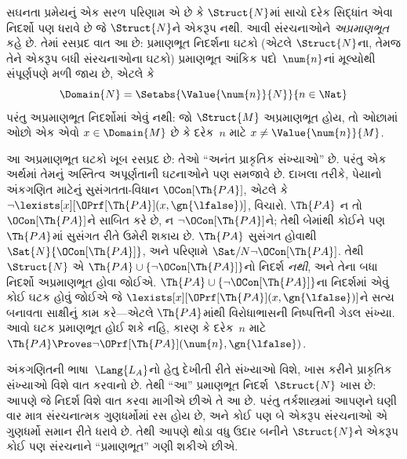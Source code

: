સઘનતા પ્રમેયનું એક સરળ પરિણામ એ છે કે $\Struct{N}$માં સાચો દરેક
સિદ્ધાંત એવા નિદર્શો પણ ધરાવે છે જે $\Struct{N}$ને એકરૂપ નથી. આવી
સંરચનાઓને \emph{અપ્રમાણભૂત} કહે છે. તેમાં રસપ્રદ વાત આ છે: પ્રમાણભૂત
નિદર્શના ઘટકો (એટલે $\Struct{N}$ના, તેમજ તેને એકરૂપ બધી
સંરચનાઓના ઘટકો) પ્રમાણભૂત આંકિક પદો~$\num{n}$નાં મૂલ્યોથી
સંપૂર્ણપણે મળી જાય છે, એટલે કે
\[
\Domain{N} = \Setabs{\Value{\num{n}}{N}}{n \in \Nat}
\]
પરંતુ અપ્રમાણભૂત નિદર્શોમાં એવું નથી: જો $\Struct{M}$ અપ્રમાણભૂત હોય,
તો ઓછામાં ઓછો એક એવો $x\in\Domain{M}$ છે કે દરેક~$n$ માટે
$x\neq\Value{\num{n}}{M}$.

આ અપ્રમાણભૂત ઘટકો ખૂબ રસપ્રદ છે: તેઓ ``અનંત પ્રાકૃતિક સંખ્યાઓ'' છે.
પરંતુ એક અર્થમાં તેમનું અસ્તિત્વ અપૂર્ણતાની ઘટનાઓને પણ સમજાવે છે.
દાખલા તરીકે, પેયાનો અંકગણિત માટેનું સુસંગતતા-વિધાન
$\OCon[\Th{PA}]$, એટલે કે
$\lnot\lexists[x][\OPrf[\Th{PA}](x,\gn{\lfalse})]$, વિચારો.
$\Th{PA}$ ન તો $\OCon[\Th{PA}]$ને સાબિત કરે છે, ન
$\lnot\OCon[\Th{PA}]$ને; તેથી
બેમાંથી કોઈને પણ $\Th{PA}$માં સુસંગત રીતે ઉમેરી શકાય છે. $\Th{PA}$
સુસંગત હોવાથી $\Sat{N}{\OCon[\Th{PA}]}$, અને પરિણામે
$\Sat/{N}{\lnot\OCon[\Th{PA}]}$. તેથી $\Struct{N}$ એ
$\Th{PA}\cup\{\lnot\OCon[\Th{PA}]\}$નો નિદર્શ \emph{નથી}, અને તેના
બધા નિદર્શો અપ્રમાણભૂત હોવા જોઈએ.
$\Th{PA}\cup\{\lnot\OCon[\Th{PA}]\}$ના નિદર્શમાં એવું કોઈ
ઘટક હોવું જોઈએ જે
$\lexists[x][\OPrf[\Th{PA}](x,\gn{\lfalse})]$ને સત્ય બનાવતા સાક્ષીનું
કામ કરે—એટલે $\Th{PA}$માંથી વિરોધાભાસની નિષ્પત્તિની ગેડલ સંખ્યા.
આવો ઘટક પ્રમાણભૂત હોઈ શકે નહિ, કારણ કે દરેક~$n$ માટે
$\Th{PA}\Proves\lnot\OPrf[\Th{PA}](\num{n},\gn{\lfalse})$.
\endgroup


\begingroup
\makeatletter{}\makeatother

\label{guunit:OLP-0193}


અંકગણિતની ભાષા~$\Lang{L_A}$નો હેતુ દેખીતી રીતે સંખ્યાઓ વિશે,
ખાસ કરીને પ્રાકૃતિક સંખ્યાઓ વિશે વાત કરવાનો છે. તેથી ``આ'' પ્રમાણભૂત
નિદર્શ~$\Struct{N}$ ખાસ છે: આપણે જે નિદર્શ વિશે વાત કરવા માગીએ છીએ
તે આ છે. પરંતુ તર્કશાસ્ત્રમાં આપણને ઘણી વાર માત્ર સંરચનાત્મક
ગુણધર્મોમાં રસ હોય છે, અને કોઈ પણ બે એકરૂપ સંરચનાઓ એ ગુણધર્મો
સમાન રીતે ધરાવે છે. તેથી આપણે થોડા વધુ ઉદાર બનીને $\Struct{N}$ને
એકરૂપ કોઈ પણ સંરચનાને ``પ્રમાણભૂત'' ગણી શકીએ છીએ.


